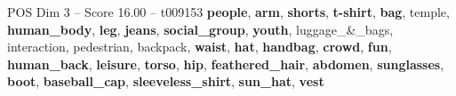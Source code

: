 \begin{textsample}{POS Dim 3 – Score 16.00 – t009153}  \label{ex:f3_pos_024}
\textbf{people}, \textbf{arm}, \textbf{shorts}, \textbf{t-shirt}, \textbf{bag}, temple, \textbf{human\_body}, \textbf{leg}, \textbf{jeans}, \textbf{social\_group}, \textbf{youth}, luggage\_\&\_bags, interaction, pedestrian, backpack, \textbf{waist}, \textbf{hat}, \textbf{handbag}, \textbf{crowd}, \textbf{fun}, \textbf{human\_back}, \textbf{leisure}, \textbf{torso}, \textbf{hip}, \textbf{feathered\_hair}, \textbf{abdomen}, \textbf{sunglasses}, \textbf{boot}, \textbf{baseball\_cap}, \textbf{sleeveless\_shirt}, \textbf{sun\_hat}, \textbf{vest}

\end{textsample}
